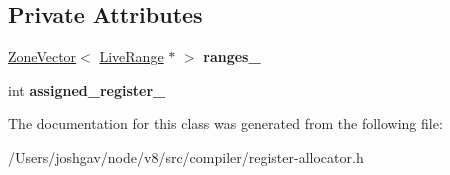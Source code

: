 \subsection*{Private Attributes}
\begin{DoxyCompactItemize}
\item 
\hyperlink{classv8_1_1internal_1_1_zone_vector}{Zone\+Vector}$<$ \hyperlink{classv8_1_1internal_1_1compiler_1_1_live_range}{Live\+Range} $\ast$ $>$ {\bfseries ranges\+\_\+}\hypertarget{classv8_1_1internal_1_1compiler_1_1_live_range_group_a0d72b1b9488b10484e4b4a9b002144ab}{}\label{classv8_1_1internal_1_1compiler_1_1_live_range_group_a0d72b1b9488b10484e4b4a9b002144ab}

\item 
int {\bfseries assigned\+\_\+register\+\_\+}\hypertarget{classv8_1_1internal_1_1compiler_1_1_live_range_group_a270bad41fb5bd0a1fe3bc1f88f0d32ab}{}\label{classv8_1_1internal_1_1compiler_1_1_live_range_group_a270bad41fb5bd0a1fe3bc1f88f0d32ab}

\end{DoxyCompactItemize}


The documentation for this class was generated from the following file\+:\begin{DoxyCompactItemize}
\item 
/\+Users/joshgav/node/v8/src/compiler/register-\/allocator.\+h\end{DoxyCompactItemize}
